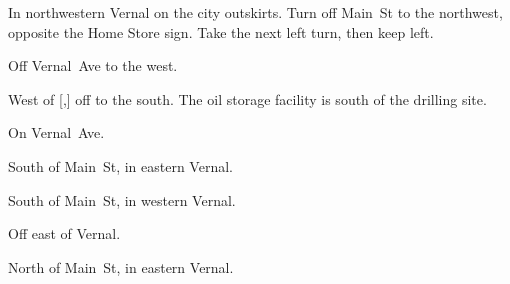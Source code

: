 
\begin{LocationList}

In northwestern Vernal on the city outskirts.
Turn off   Main~St to the northwest, opposite the Home Store sign.
Take the next left turn, then keep left.

Off  Vernal~Ave to the west.

West of [,] off   to the south.
The oil storage facility is south of the drilling site.

\Location{\GarageHQ \Garage}
On  Vernal~Ave.

South of  Main~St, in eastern Vernal.

South of   Main~St, in western Vernal.

\Location{\TruckStop \Gas \Rest \Service \Weigh \SpecialTransport}
Off  east of Vernal.

North of  Main~St, in eastern Vernal.

\end{LocationList}
